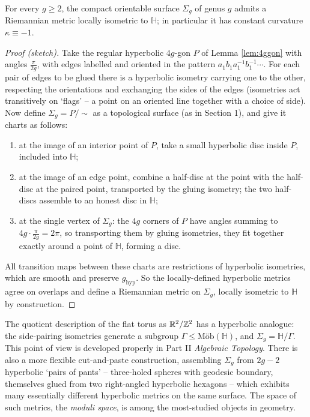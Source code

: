 \documentclass[a4paper]{scrartcl}
\newcommand{\Mob}{\text{M\"ob}}
\newcommand{\HH}{\mathbb{H}}
\begin{document}
\begin{theorem}
    For every $g \geq 2$, the compact orientable surface $\Sigma_g$ of genus $g$ admits a Riemannian metric locally isometric to $\HH$; in particular it has constant curvature $\kappa \equiv -1$.
\end{theorem}
\begin{proof}[Proof (sketch)]
    Take the regular hyperbolic $4g$-gon $P$ of Lemma \ref{lem:4ggon} with angles $\frac{\pi}{2g}$, with edges labelled and oriented in the pattern $a_1 b_1 a_1^{-1}b_1^{-1}\cdots$. For each pair of edges to be glued there is a hyperbolic isometry carrying one to the other, respecting the orientations and exchanging the sides of the edges (isometries act transitively on `flags' -- a point on an oriented line together with a choice of side). Now define $\Sigma_g = P/\sim$ as a topological surface (as in Section 1), and give it charts as follows:
    \begin{enumerate}[label=(\roman*)]
        \item at the image of an interior point of $P$, take a small hyperbolic disc inside $P$, included into $\HH$;
        \item at the image of an edge point, combine a half-disc at the point with the half-disc at the paired point, transported by the gluing isometry; the two half-discs assemble to an honest disc in $\HH$;
        \item at the single vertex of $\Sigma_g$: the $4g$ corners of $P$ have angles summing to $4g \cdot \frac{\pi}{2g} = 2\pi$, so transporting them by gluing isometries, they fit together exactly around a point of $\HH$, forming a disc.
    \end{enumerate}
    All transition maps between these charts are restrictions of hyperbolic isometries, which are smooth and preserve $g_{\mathrm{hyp}}$. So the locally-defined hyperbolic metrics agree on overlaps and define a Riemannian metric on $\Sigma_g$, locally isometric to $\HH$ by construction.
\end{proof}

\begin{remark}
    The quotient description of the flat torus as $\mathbb{R}^2/\mathbb{Z}^2$ has a hyperbolic analogue: the side-pairing isometries generate a subgroup $\Gamma \leq \Mob(\HH)$, and $\Sigma_g = \HH/\Gamma$. This point of view is developed properly in Part II \emph{Algebraic Topology}. There is also a more flexible cut-and-paste construction, assembling $\Sigma_g$ from $2g - 2$ hyperbolic `pairs of pants' -- three-holed spheres with geodesic boundary, themselves glued from two right-angled hyperbolic hexagons -- which exhibits many essentially different hyperbolic metrics on the same surface. The space of such metrics, the \emph{moduli space}, is among the most-studied objects in geometry.
\end{remark}
\end{document}
